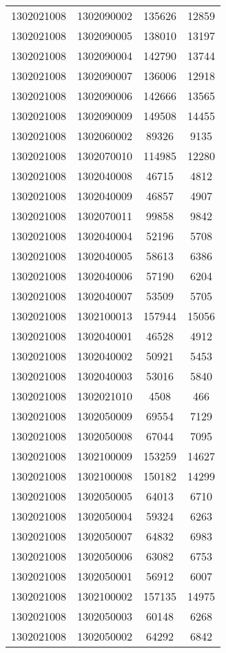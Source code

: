 \begin{longtable}[h]{llcc}
		1302021008 & 1302090002 & 135626 & 12859\\
		1302021008 & 1302090005 & 138010 & 13197\\
		1302021008 & 1302090004 & 142790 & 13744\\
		1302021008 & 1302090007 & 136006 & 12918\\
		1302021008 & 1302090006 & 142666 & 13565\\
		1302021008 & 1302090009 & 149508 & 14455\\
		1302021008 & 1302060002 & 89326 & 9135\\
		1302021008 & 1302070010 & 114985 & 12280\\
		1302021008 & 1302040008 & 46715 & 4812\\
		1302021008 & 1302040009 & 46857 & 4907\\
		1302021008 & 1302070011 & 99858 & 9842\\
		1302021008 & 1302040004 & 52196 & 5708\\
		1302021008 & 1302040005 & 58613 & 6386\\
		1302021008 & 1302040006 & 57190 & 6204\\
		1302021008 & 1302040007 & 53509 & 5705\\
		1302021008 & 1302100013 & 157944 & 15056\\
		1302021008 & 1302040001 & 46528 & 4912\\
		1302021008 & 1302040002 & 50921 & 5453\\
		1302021008 & 1302040003 & 53016 & 5840\\
		1302021008 & 1302021010 & 4508 & 466\\
		1302021008 & 1302050009 & 69554 & 7129\\
		1302021008 & 1302050008 & 67044 & 7095\\
		1302021008 & 1302100009 & 153259 & 14627\\
		1302021008 & 1302100008 & 150182 & 14299\\
		1302021008 & 1302050005 & 64013 & 6710\\
		1302021008 & 1302050004 & 59324 & 6263\\
		1302021008 & 1302050007 & 64832 & 6983\\
		1302021008 & 1302050006 & 63082 & 6753\\
		1302021008 & 1302050001 & 56912 & 6007\\
		1302021008 & 1302100002 & 157135 & 14975\\
		1302021008 & 1302050003 & 60148 & 6268\\
		1302021008 & 1302050002 & 64292 & 6842\\

\end{longtable}
